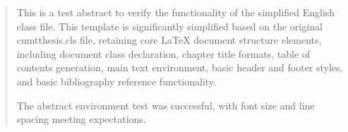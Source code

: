 \begin{abstract}
This is a test abstract to verify the functionality of the simplified English class file. This template is significantly simplified based on the original cumtthesis.cls file, retaining core LaTeX document structure elements, including document class declaration, chapter title formats, table of contents generation, main text environment, basic header and footer styles, and basic bibliography reference functionality.

The abstract environment test was successful, with font size and line spacing meeting expectations.
\end{abstract}